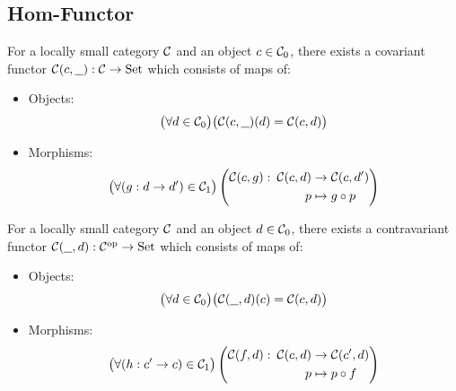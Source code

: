 \subsection{Hom-Functor}

\begin{definition}
  For a locally small category $\mathcal{C}$ and an object $c\in \mathcal{C}_0$, there exists a
  covariant functor $\mathcal{C}(c, \underline{\ \ }) : \mathcal{C} \to \mathrm{Set}$ which consists of maps
  of:
  \parencite{leinster:basic_category_theory}
  \begin{itemize}
    \item Objects:
      \[\big(\forall d \in \mathcal{C}_0\big)
        \big(\mathcal{C}(c, \underline{\ \ })(d) = \mathcal{C}(c, d)\big)\]
    \item Morphisms:
      \[
        \begin{gathered}
          \big(\forall (g: d\to d')\in \mathcal{C}_1\big)
          \left(
            \begin{aligned}
              \mathcal{C}(c, g):&&\!\!\! \mathcal{C}(c, d) &\to \mathcal{C}(c, d')\\
              &&p &\mapsto g\circ p
            \end{aligned}
          \right)
        \end{gathered}
      \]
  \end{itemize}
\end{definition}

\begin{definition}
  For a locally small category $\mathcal{C}$ and an object $d\in \mathcal{C}_0$, there exists a
  contravariant functor $\mathcal{C}(\underline{\ \ }, d) : \mathcal{C}^{\mathrm{op}} \to \mathrm{Set}$ which consists
  of maps of:
  \parencite{leinster:basic_category_theory}
  \begin{itemize}
    \item Objects:
      \[\big(\forall d \in \mathcal{C}_0\big)
        \big(\mathcal{C}(\underline{\ \ }, d)(c) = \mathcal{C}(c, d)\big)\]
    \item Morphisms:
      \[
        \begin{gathered}
          \big(\forall (h: c'\to c)\in \mathcal{C}_1\big)
          \left(
            \begin{aligned}
              \mathcal{C}(f, d):&&\!\!\! \mathcal{C}(c, d) &\to \mathcal{C}(c', d)\\
              &&p &\mapsto p\circ f
            \end{aligned}
          \right)
        \end{gathered}
      \]
  \end{itemize}
\end{definition}

